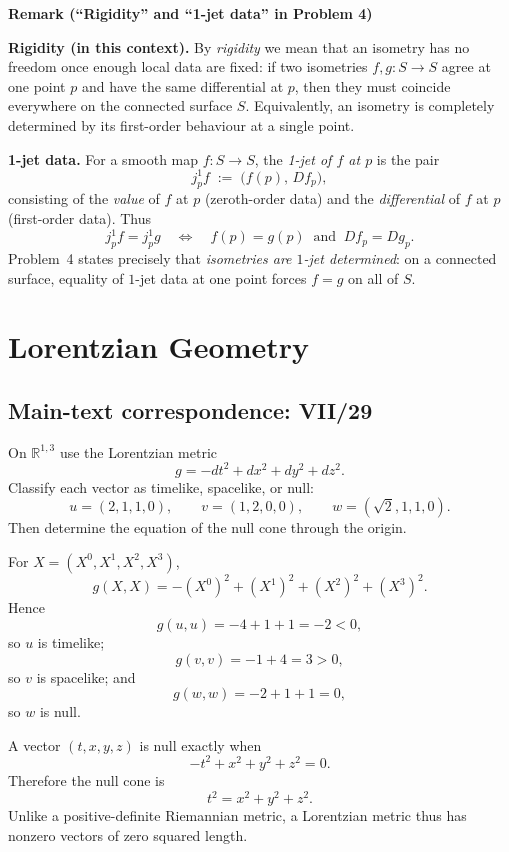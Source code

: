 \begin{solution}
\par\medskip\noindent\textbf{Remark (``Rigidity'' and ``1-jet data'' in Problem 4)}\par\smallskip


\textbf{Rigidity (in this context).}
By \emph{rigidity} we mean that an isometry has no freedom once enough local data are fixed:
if two isometries $f,g:S\to S$ agree at one point $p$ and have the same differential at $p$,
then they must coincide everywhere on the connected surface $S$.
Equivalently, an isometry is completely determined by its first-order behaviour at a single point.

\medskip
\textbf{1-jet data.}
For a smooth map $f:S\to S$, the \emph{1-jet of $f$ at $p$} is the pair
\[
j_p^1 f \;:=\; \bigl(f(p),\, Df_p\bigr),
\]
consisting of the \emph{value} of $f$ at $p$ (zeroth-order data) and the \emph{differential}
of $f$ at $p$ (first-order data). Thus
\[
j_p^1 f = j_p^1 g
\quad\Longleftrightarrow\quad
f(p)=g(p)\ \text{ and }\ Df_p=Dg_p.
\]
Problem~4 states precisely that \emph{isometries are $1$-jet determined}:
on a connected surface, equality of $1$-jet data at one point forces $f=g$ on all of $S$.
\end{solution}

\section{Lorentzian Geometry}

\subsection*{Main-text correspondence: VII/29}

\begin{problem}
\label{prob:cp-vii-0081}
On \(\mathbb{R}^{1,3}\) use the Lorentzian metric
\[
g=-dt^2+dx^2+dy^2+dz^2.
\]
Classify each vector as timelike, spacelike, or null:
\[
u=(2,1,1,0),\qquad
v=(1,2,0,0),\qquad
w=(\sqrt2,1,1,0).
\]
Then determine the equation of the null cone through the origin.
\end{problem}

\begin{solution}
For \(X=(X^0,X^1,X^2,X^3)\),
\[
g(X,X)=-(X^0)^2+(X^1)^2+(X^2)^2+(X^3)^2.
\]
Hence
\[
g(u,u)=-4+1+1=-2<0,
\]
so \(u\) is timelike;
\[
g(v,v)=-1+4=3>0,
\]
so \(v\) is spacelike; and
\[
g(w,w)=-2+1+1=0,
\]
so \(w\) is null.

A vector \((t,x,y,z)\) is null exactly when
\[
-t^2+x^2+y^2+z^2=0.
\]
Therefore the null cone is
\[
\boxed{t^2=x^2+y^2+z^2}.
\]
Unlike a positive-definite Riemannian metric, a Lorentzian metric thus
has nonzero vectors of zero squared length.
\end{solution}

